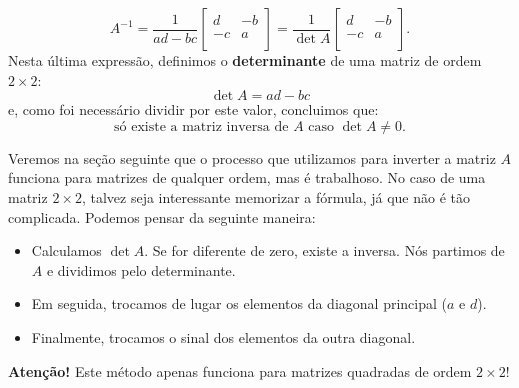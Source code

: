 \documentclass[../livro.tex]{subfiles}  %
\begin{document}
\begin{equation}
\boxed{A^{-1} = \frac{1}{ad - bc} \left[
	\begin{array}{cc}
	d  & -b  \\
	-c & a \\
	\end{array}
	\right] =
	\frac{1}{\det A} \left[
	\begin{array}{cc}
	d  & -b  \\
	-c & a \\
	\end{array}
	\right].}
\end{equation} Nesta última expressão, definimos o \textbf{determinante} de uma matriz de ordem $2\times 2$:
\begin{equation}
\det A = ad - bc
\end{equation} e, como foi necessário dividir por este valor, concluimos que:
\begin{equation}
\boxed{\text{só existe a matriz inversa de $A$ caso $\det A \neq 0$.}}
\end{equation}


\begin{remark}
	Veremos na seção seguinte que o processo que utilizamos para inverter a matriz $A$ funciona para matrizes de qualquer ordem, mas é trabalhoso. No caso de uma matriz $2\times 2$, talvez seja interessante memorizar a fórmula, já que não é tão complicada. Podemos pensar da seguinte maneira:
	\begin{itemize}
		\item Calculamos $\det A$. Se for diferente de zero, existe a inversa. Nós partimos de $A$ e dividimos pelo determinante.
		\item Em seguida, trocamos de lugar os elementos da diagonal principal ($a$ e $d$).
		\item Finalmente, trocamos o sinal dos elementos da outra diagonal.
	\end{itemize}
	\textbf{Atenção!} Este método apenas funciona para matrizes quadradas de ordem $2\times 2$!
\end{remark}
\end{document}
